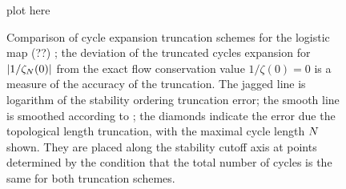 \begin{figure}
\begin{center}
plot here %
\end{center}
\caption{
    {\small
Comparison of cycle expansion truncation schemes for the
logistic map (??)%
;
the deviation of the truncated cycles
expansion for $|1/\zeta_N(0)|$ from the exact
flow conservation value $1/\zeta(0)=0$ is a measure of the accuracy of the
truncation.  The jagged
line is logarithm of the stability ordering
truncation error; the smooth line is smoothed according to
; the diamonds indicate the error
due the topological length truncation, with
the maximal cycle length $N$ shown.
They are placed along the stability cutoff axis at points determined
by the condition that the total number of cycles is the same for both
truncation schemes.
        }}
\label{fig:logStabOrder}
\end{figure}
